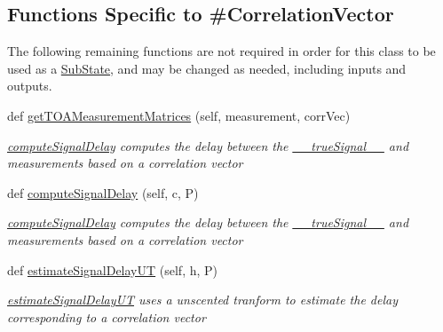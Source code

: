 \subsection*{Functions Specific to \#Correlation\+Vector}
\label{_amgrpb77571167b4af2d56b573fb28e024ebf}%
The following remaining functions are not required in order for this class to be used as a \hyperlink{namespacemodest_1_1substates_1_1SubState}{Sub\+State}, and may be changed as needed, including inputs and outputs.\begin{DoxyCompactItemize}
\item 
def \hyperlink{classmodest_1_1substates_1_1CorrelationVector_1_1CorrelationVector_a1c2ef3b40f37a9f69ae26ed7155402bf}{get\+T\+O\+A\+Measurement\+Matrices} (self, measurement, corr\+Vec)
\begin{DoxyCompactList}\small\item\em \hyperlink{classmodest_1_1substates_1_1CorrelationVector_1_1CorrelationVector_ab4d8e31d05b40d4483a530db0aaeb3a4}{compute\+Signal\+Delay} computes the delay between the \hyperlink{classmodest_1_1substates_1_1CorrelationVector_1_1CorrelationVector_a40f65c10e255c043d8f56d17d152e705}{\+\_\+\+\_\+true\+Signal\+\_\+\+\_\+} and measurements based on a correlation vector \end{DoxyCompactList}\item 
def \hyperlink{classmodest_1_1substates_1_1CorrelationVector_1_1CorrelationVector_ab4d8e31d05b40d4483a530db0aaeb3a4}{compute\+Signal\+Delay} (self, c, P)
\begin{DoxyCompactList}\small\item\em \hyperlink{classmodest_1_1substates_1_1CorrelationVector_1_1CorrelationVector_ab4d8e31d05b40d4483a530db0aaeb3a4}{compute\+Signal\+Delay} computes the delay between the \hyperlink{classmodest_1_1substates_1_1CorrelationVector_1_1CorrelationVector_a40f65c10e255c043d8f56d17d152e705}{\+\_\+\+\_\+true\+Signal\+\_\+\+\_\+} and measurements based on a correlation vector \end{DoxyCompactList}\item 
def \hyperlink{classmodest_1_1substates_1_1CorrelationVector_1_1CorrelationVector_a0d4d2a86f69f42b3660752c215f96149}{estimate\+Signal\+Delay\+UT} (self, h, P)
\begin{DoxyCompactList}\small\item\em \hyperlink{classmodest_1_1substates_1_1CorrelationVector_1_1CorrelationVector_a0d4d2a86f69f42b3660752c215f96149}{estimate\+Signal\+Delay\+UT} uses a unscented tranform to estimate the delay corresponding to a correlation vector \end{DoxyCompactList}\item 

\end{DoxyCompactItemize}
